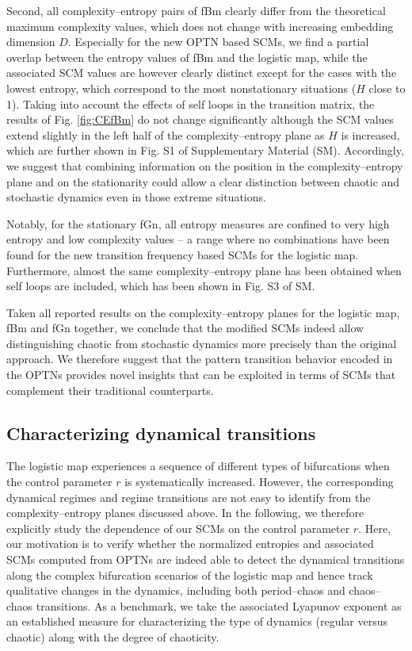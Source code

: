 \documentclass[aip,cha,reprint,nofootinbib]{revtex4-1}
\begin{document}
Second, all complexity--entropy pairs of fBm clearly differ from the theoretical maximum complexity values, which does not change with increasing embedding dimension $D$. Especially for the new OPTN based SCMs, we find a partial overlap between the entropy values of fBm and the logistic map, while the associated SCM values are however clearly distinct except for the cases with the lowest entropy, which correspond to the most nonstationary situations ($H$ close to 1). {\color{red}Taking into account the effects of self loops in the transition matrix, the results of Fig. \ref{fig:CEfBm} do not change significantly although the SCM values extend slightly in the left half of the complexity--entropy plane as $H$ is increased, which are further shown in Fig. S1 of Supplementary Material (SM).} Accordingly, we suggest that combining information on the position in the complexity--entropy plane and on the stationarity could allow a clear distinction between chaotic and stochastic dynamics even in those extreme situations. 

Notably, for the stationary fGn, all entropy measures are confined to very high entropy and low complexity values -- a range where no combinations have been found for the new transition frequency based SCMs for the logistic map. {\color{red}Furthermore, almost the same complexity--entropy plane has been obtained when self loops are included, which has been shown in Fig. S3 of SM. }

Taken all reported results on the complexity--entropy planes for the logistic map, fBm and fGn together, we conclude that the modified SCMs indeed allow distinguishing chaotic from stochastic dynamics more precisely than the original approach. We therefore suggest that the pattern transition behavior encoded in the OPTNs provides novel insights that can be exploited in terms of SCMs that complement their traditional counterparts. 


\subsection{Characterizing dynamical transitions} \label{sec:transi}
The logistic map experiences a sequence of different types of bifurcations when the control parameter $r$ is systematically increased. However, the corresponding dynamical regimes and regime transitions are not easy to identify from the complexity--entropy planes discussed above. In the following, we therefore explicitly study the dependence of our SCMs on the control parameter $r$. Here, our motivation is to verify whether the normalized entropies and associated SCMs computed from OPTNs are indeed able to detect the dynamical transitions along the complex bifurcation scenarios of the logistic map and hence track qualitative changes in the dynamics, including both period--chaos and chaos--chaos transitions. As a benchmark, we take the associated Lyapunov exponent as an established measure for characterizing the type of dynamics (regular versus chaotic) along with the degree of chaoticity.
\end{document}
